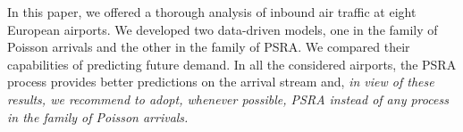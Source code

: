 \documentclass[]{elsarticle}
\begin{document}





  In this paper, we offered a thorough analysis of inbound air traffic at eight European airports. We developed two data-driven models, one in the family of Poisson arrivals and the other in the family of \ac{PSRA}.
  We compared their capabilities of predicting future demand.
  In all the considered airports, the \ac{PSRA} process provides better predictions on the arrival stream and, \emph{in view of these results, we recommend to adopt, whenever possible, \ac{PSRA} instead of any process in the family of Poisson arrivals.}
\end{document}
